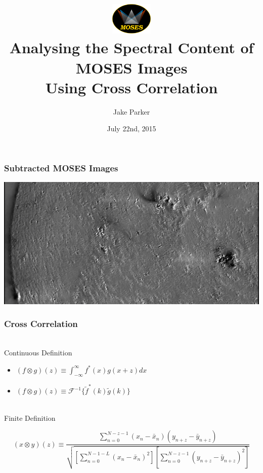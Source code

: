 \documentclass[landscape,xcolor={table},10pt]{beamer}
\title[...]{\includegraphics[width=2cm]{images/moses_logo_with_text}  \\Analysing the Spectral Content of MOSES Images \\Using Cross Correlation}
\author[Parker]{Jake Parker}
\institute{}
\date{July 22nd, 2015 \\ }
\begin{document}
	\begin{frame}[plain]
	        \titlepage
	\end{frame}
	\begin{frame}
		\frametitle{Subtracted MOSES Images}
{\includegraphics[scale=.3]{images/plus-zero_3.png}	}	
		
	\end{frame}
	\begin{frame}
		
		\frametitle{Cross Correlation}
\\Continuous Definition			
			\begin{itemize}
				\item $ (f \otimes g) (z) \equiv \int_{-\infty}^{\infty} f^*(x) g(x+z) dx$
				\item $(f \otimes g) (z) \equiv \mathcal{F}^{-1} \lbrace \tilde{f}^* (k) \tilde{g}(k)\rbrace$
			\end{itemize}
			
\\Finite Definition
	
$$ (x \otimes y) (z) \equiv \dfrac{ \sum_{n=0}^{N-z-1} (x_n-\bar{x}_n)(y_{n+z}-\bar{y}_{n+z})   }{\sqrt{[\sum_{n=0}^{N-1-L} (x_n-\bar{x}_n)^2][\sum_{n=0}^{N-z-1} (y_{n+z}-\bar{y}_{n+z})^2 ]}}$$
	
			
	

\end{frame}
\end{document}
